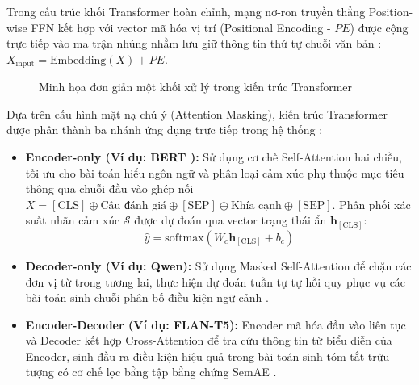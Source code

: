 Trong cấu trúc khối Transformer hoàn chỉnh, mạng nơ-ron truyền thẳng Position-wise FFN \cite{vaswani2017attention} kết hợp với vector mã hóa vị trí (Positional Encoding - $PE$) được cộng trực tiếp vào ma trận nhúng nhằm lưu giữ thông tin thứ tự chuỗi văn bản \cite{vaswani2017attention}: $X_{\text{input}} = \text{Embedding}(X) + PE$.

\begin{figure}[htbp]
\centering
{}
\caption{Minh họa đơn giản một khối xử lý trong kiến trúc Transformer}
\label{fig:dev-chap2-transformer-block}
\end{figure}

Dựa trên cấu hình mặt nạ chú ý (Attention Masking), kiến trúc Transformer được phân thành ba nhánh ứng dụng trực tiếp trong hệ thống \cite{vaswani2017attention}:
\begin{itemize}
\item \textbf{Encoder-only (Ví dụ: BERT \cite{devlin2019bert}):} Sử dụng cơ chế Self-Attention hai chiều, tối ưu cho bài toán hiểu ngôn ngữ và phân loại cảm xúc phụ thuộc mục tiêu thông qua chuỗi đầu vào ghép nối $X = [\text{CLS}] \oplus \text{Câu đánh giá} \oplus [\text{SEP}] \oplus \text{Khía cạnh} \oplus [\text{SEP}]$. Phân phối xác suất nhãn cảm xúc $\mathcal{S}$ được dự đoán qua vector trạng thái ẩn $\mathbf{h}_{[\text{CLS}]}$:
\begin{equation}
\hat{y} = \text{softmax}(W_c \mathbf{h}_{[\text{CLS}]} + b_c)
\label{eq:dev-chap2-bert-absa-output}
\end{equation}
\item \textbf{Decoder-only (Ví dụ: Qwen):} Sử dụng Masked Self-Attention để chặn các đơn vị từ trong tương lai, thực hiện dự đoán tuần tự tự hồi quy phục vụ các bài toán sinh chuỗi phân bố điều kiện ngữ cảnh \cite{vaswani2017attention, brown2020language}.
\item \textbf{Encoder-Decoder (Ví dụ: FLAN-T5):} Encoder mã hóa đầu vào liên tục và Decoder kết hợp Cross-Attention để tra cứu thông tin từ biểu diễn của Encoder, sinh đầu ra điều kiện hiệu quả trong bài toán sinh tóm tắt trừu tượng có cơ chế lọc bằng tập bằng chứng SemAE \cite{vaswani2017attention, angelidis2021extractive}.
\end{itemize}
